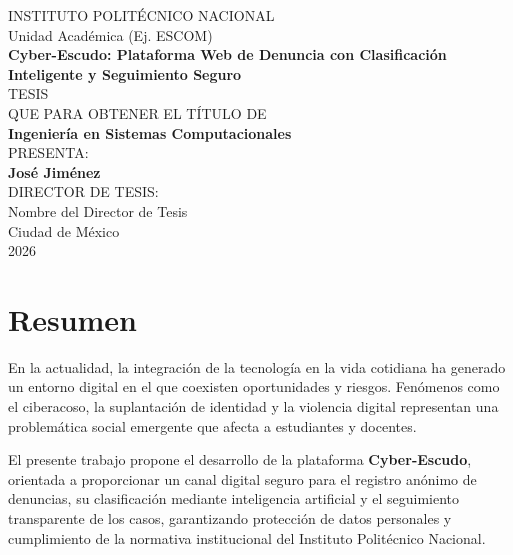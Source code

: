 \documentclass[12pt,oneside]{report}
\newcommand{\titulo}{Cyber-Escudo: Plataforma Web de Denuncia con Clasificación Inteligente y Seguimiento Seguro}
\newcommand{\autor}{José Jiménez}
\newcommand{\carrera}{Ingeniería en Sistemas Computacionales}
\newcommand{\director}{Nombre del Director de Tesis}
\newcommand{\unidad}{Unidad Académica (Ej. ESCOM)}
\newcommand{\anio}{2026}
\begin{document}
\begin{titlepage}
\begin{center}

{\Large INSTITUTO POLITÉCNICO NACIONAL} \\[0.5cm]
{\large \unidad} \\[1.5cm]

{\Large \textbf{\titulo}} \\[1.5cm]

TESIS \\[0.3cm]
QUE PARA OBTENER EL TÍTULO DE \\[0.3cm]
{\textbf{\carrera}} \\[1cm]

PRESENTA: \\[0.3cm]
{\textbf{\autor}} \\[1cm]

DIRECTOR DE TESIS: \\[0.3cm]
{\director} \\[2cm]

Ciudad de México \\[0.3cm]
\anio

\end{center}
\end{titlepage}


\chapter*{Resumen}

En la actualidad, la integración de la tecnología en la vida cotidiana ha generado un entorno digital en el que coexisten oportunidades y riesgos. Fenómenos como el ciberacoso, la suplantación de identidad y la violencia digital representan una problemática social emergente que afecta a estudiantes y docentes.

El presente trabajo propone el desarrollo de la plataforma \textbf{Cyber-Escudo}, orientada a proporcionar un canal digital seguro para el registro anónimo de denuncias, su clasificación mediante inteligencia artificial y el seguimiento transparente de los casos, garantizando protección de datos personales y cumplimiento de la normativa institucional del Instituto Politécnico Nacional.
\end{document}

